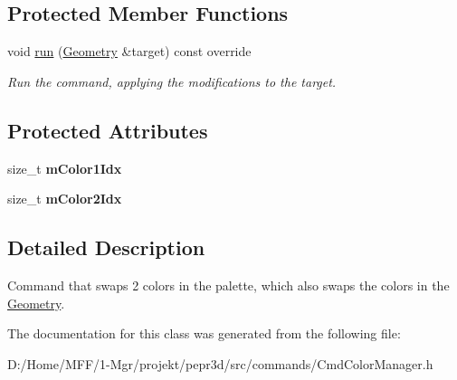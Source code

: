 \subsection*{Protected Member Functions}
\begin{DoxyCompactItemize}
\item 
\mbox{\label{classpepr3d_1_1_cmd_color_manager_swap_colors_a8b2d71615f5391bfa047ab34ac81c08b}} 
void \mbox{\hyperlink{classpepr3d_1_1_cmd_color_manager_swap_colors_a8b2d71615f5391bfa047ab34ac81c08b}{run}} (\mbox{\hyperlink{classpepr3d_1_1_geometry}{Geometry}} \&target) const override
\begin{DoxyCompactList}\small\item\em Run the command, applying the modifications to the target. \end{DoxyCompactList}\end{DoxyCompactItemize}
\subsection*{Protected Attributes}
\begin{DoxyCompactItemize}
\item 
\mbox{\label{classpepr3d_1_1_cmd_color_manager_swap_colors_ab844b45f5817551eb8cf94a6a79e8562}} 
size\+\_\+t {\bfseries m\+Color1\+Idx}
\item 
\mbox{\label{classpepr3d_1_1_cmd_color_manager_swap_colors_aaf0ac35ec3fad9416ce04a2e3af135d8}} 
size\+\_\+t {\bfseries m\+Color2\+Idx}
\end{DoxyCompactItemize}


\subsection{Detailed Description}
Command that swaps 2 colors in the palette, which also swaps the colors in the \mbox{\hyperlink{classpepr3d_1_1_geometry}{Geometry}}. 

The documentation for this class was generated from the following file\+:\begin{DoxyCompactItemize}
\item 
D\+:/\+Home/\+M\+F\+F/1-\/\+Mgr/projekt/pepr3d/src/commands/Cmd\+Color\+Manager.\+h\end{DoxyCompactItemize}
